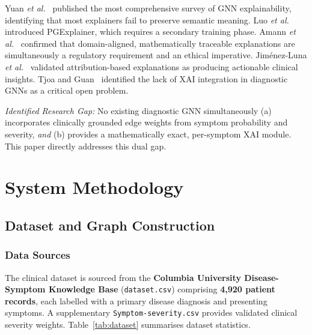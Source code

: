 \documentclass[conference]{IEEEtran}
\begin{document}
Yuan \textit{et al.}~\cite{yuan2023explainability} published the most
comprehensive survey of GNN explainability, identifying that most
explainers fail to preserve semantic meaning. Luo \textit{et
al.}~\cite{luo2020parameterized} introduced PGExplainer, which
requires a secondary training phase. Amann \textit{et
al.}~\cite{amann2020explainability} confirmed that
domain-aligned, mathematically traceable explanations are
simultaneously a regulatory requirement and an ethical imperative.
Jim\'{e}nez-Luna \textit{et al.}~\cite{jimenezluna2020drug} validated
attribution-based explanations as producing actionable clinical
insights. Tjoa and Guan~\cite{tjoa2021survey} identified the lack
of XAI integration in diagnostic GNNs as a critical open problem.

\noindent\textit{Identified Research Gap:} No existing diagnostic GNN
simultaneously (a) incorporates clinically grounded edge weights from
symptom probability and severity, \textit{and} (b) provides a
mathematically exact, per-symptom XAI module. This paper directly
addresses this dual gap.

\section{System Methodology}
\label{sec:methodology}

\subsection{Dataset and Graph Construction}

\subsubsection{Data Sources}
The clinical dataset is sourced from the \textbf{Columbia University
Disease-Symptom Knowledge Base} (\texttt{dataset.csv}) comprising
\textbf{4,920 patient records}, each labelled with a primary disease
diagnosis and presenting symptoms. A supplementary
\texttt{Symptom-severity.csv} provides validated clinical severity
weights. Table~\ref{tab:dataset} summarises dataset statistics.
\end{document}
